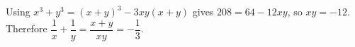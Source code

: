 Using $x^3+y^3=(x+y)^3-3xy(x+y)$ gives $208=64-12xy$, so $xy=-12$. Therefore $\dfrac{1}{x}+\dfrac{1}{y}=\dfrac{x+y}{xy}=\boxed{-\dfrac{1}{3}}$.
